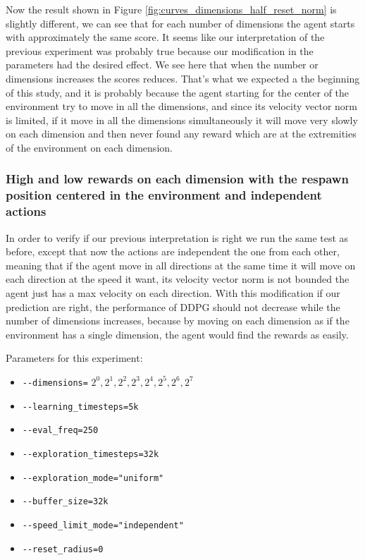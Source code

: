 \documentclass{article}
\begin{document}
Now the result shown in Figure \ref{fig:curves_dimensions_half_reset_norm} is slightly different, we can see that for each number of dimensions the agent starts with approximately the same score. It seems like our interpretation of the previous experiment was probably true because our modification in the parameters had the desired effect. We see here that when the number or dimensions increases the scores reduces. That's what we expected a the beginning of this study, and it is probably because the agent starting for the center of the environment try to move in all the dimensions, and since its velocity vector norm is limited, if it move in all the dimensions simultaneously it will move very slowly on each dimension and then never found any reward which are at the extremities of the environment on each dimension.

\subsubsection{High and low rewards on each dimension with the respawn position centered in the environment and independent actions}

In order to verify if our previous interpretation is right we run the same test as before, except that now the actions are independent the one from each other, meaning that if the agent move in all directions at the same time it will move on each direction at the speed it want, its velocity vector norm is not bounded the agent just has a max velocity on each direction. With this modification if our prediction are right, the performance of DDPG should not decrease while the number of dimensions increases, because by moving on each dimension as if the environment has a single dimension, the agent would find the rewards as easily.

Parameters for this experiment:
\begin{itemize}
    \item[] \lstinline|--dimensions=| $2^0, 2^1, 2^2, 2^3, 2^4, 2^5, 2^6, 2^7$
    \item[] \lstinline|--learning_timesteps=5k|
    \item[] \lstinline|--eval_freq=250|
    \item[] \lstinline|--exploration_timesteps=32k|
    \item[] \lstinline|--exploration_mode="uniform"|
    \item[] \lstinline|--buffer_size=32k|
    \item[] \lstinline|--speed_limit_mode="independent"|
    \item[] \lstinline|--reset_radius=0|
\end{itemize}
\end{document}
